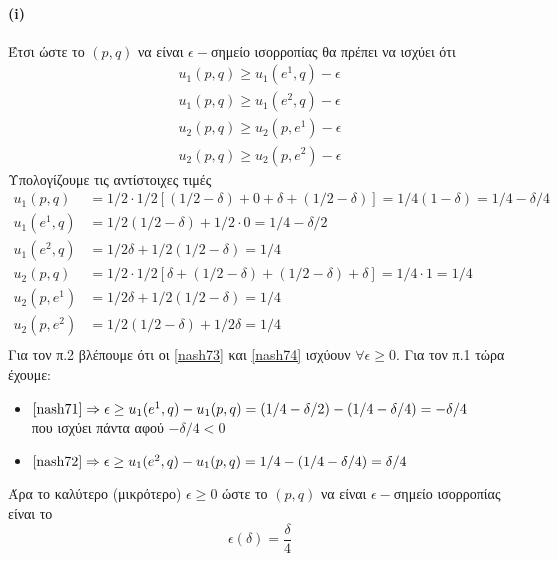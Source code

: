 \documentclass[a4paper,11pt]{article}
\begin{document}
\paragraph{(i)} Έτσι ώστε το $(p,q)$ να είναι $\epsilon-$σημείο ισορροπίας θα πρέπει να ισχύει ότι
\begin{align}
  u_1(p,q) \geq u_1(e^1,q) - \epsilon \label{nash71}\\
  u_1(p,q) \geq u_1(e^2,q) - \epsilon \label{nash72}\\
  u_2(p,q) \geq u_2(p,e^1) - \epsilon \label{nash73}\\
  u_2(p,q) \geq u_2(p,e^2) - \epsilon \label{nash74}
\end{align}
Υπολογίζουμε τις αντίστοιχες τιμές
\begin{align*}
  u_1(p,q) &= 1/2 \cdot 1/2 \left[(1/2-\delta)+0+\delta+(1/2-\delta)\right] = 1/4(1-\delta) = 1/4-\delta/4&\\
  u_1(e^1,q) &= 1/2(1/2-\delta)+1/2 \cdot 0 = 1/4-\delta/2\\
  u_1(e^2,q) &= 1/2\delta+1/2(1/2-\delta) = 1/4\\[3pt]
  u_2(p,q) &= 1/2 \cdot 1/2 \left[\delta+(1/2-\delta)+(1/2-\delta)+\delta\right] = 1/4 \cdot 1 = 1/4\\
  u_2(p,e^1) &= 1/2\delta+1/2(1/2-\delta) = 1/4\\
  u_2(p,e^2) &= 1/2(1/2-\delta)+1/2\delta = 1/4\\
\end{align*}
Για τον π.2 βλέπουμε ότι οι \eqref{nash73} και \eqref{nash74} ισχύουν $\forall \epsilon \geq 0$.
Για τον π.1 τώρα έχουμε:
\begin{itemize}
	\item $\eqref{nash71} \Rightarrow \epsilon \geq u_1(e^1,q)-u_1(p,q) = (1/4-\delta/2) - (1/4-\delta/4) = -\delta/4$\\
	  που ισχύει πάντα αφού $-\delta/4 < 0$
	\item $\eqref{nash72} \Rightarrow \epsilon \geq u_1(e^2,q)-u_1(p,q) = 1/4 - (1/4-\delta/4) = \delta/4$
\end{itemize}
Άρα το καλύτερο (μικρότερο) $\epsilon \geq 0$ ώστε το $(p,q)$ να είναι $\epsilon-$σημείο ισορροπίας είναι το
\[\epsilon(\delta) = \frac{\delta}{4}\]
\end{document}
